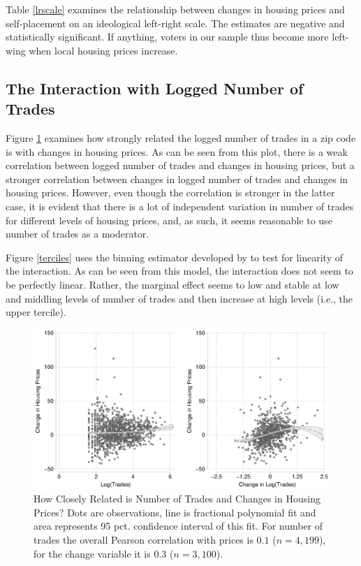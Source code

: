 \documentclass[12pt,a4paper]{article}
\begin{document}
			Table \ref{lrscale} examines the relationship between changes in housing prices and  self-placement on an ideological left-right scale. The estimates are negative and statistically significant. If anything, voters in our sample thus become more left-wing when local housing prices increase.
			
			
			
			
			
			
			\clearpage
			
			\subsection{The Interaction with Logged Number of Trades} \label{app_interaction}
			\setcounter{table}{0}
			\setcounter{figure}{0}
			
			Figure \ref{scatter} examines how strongly related the logged number of trades in a zip code is with changes in housing prices. As can be seen from this plot, there is a weak correlation between logged number of trades and changes in housing prices, but a stronger correlation between changes in logged number of trades and changes in housing prices. However, even though the correlation is stronger in the latter case, it is evident that there is a lot of independent variation in number of trades for different levels of housing prices, and, as such, it seems reasonable to use number of trades as a moderator.
			
			Figure \ref{terciles} uses the binning estimator developed by \cite{hainmueller2016much} to test for linearity of the interaction. As can be seen from this model, the interaction does not seem to be perfectly linear. Rather, the marginal effect seems to low and stable at low and middling levels of number of trades and then increase at high levels (i.e., the upper tercile).
			
			\begin{figure}
				\includegraphics[width=1\textwidth]{../figures/corrmoderator.eps}
				\caption{How Closely Related is Number of Trades and Changes in Housing Prices? Dots are observations, line is fractional polynomial fit and area represents 95 pct. confidence interval of this fit. For number of trades the overall Pearson correlation with prices is $0.1$ ($n=4,199$), for the change variable it is $0.3$ ($n=3,100$). }
				\label{scatter}
			\end{figure}
			
\end{document}
